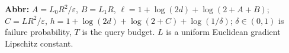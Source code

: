 \begin{table}[tp]
\begin{threeparttable}
\begin{tabularx}{\linewidth}{@{}>{\raggedright\arraybackslash}p{0.20\linewidth}>{\raggedright\arraybackslash}p{0.32\linewidth}>{\raggedright\arraybackslash}p{0.25\linewidth}>{\raggedright\arraybackslash}X@{}}
\bottomrule
\end{tabularx}
\begin{tablenotes}[flushleft]\footnotesize
\item[] \textbf{Abbr:} $A=L_0R^2/\varepsilon$, $B=L_1R$, $\ell=1+\log(2d)+\log(2+A+B)$; $C=LR^2/\varepsilon$, $h=1+\log(2d)+\log(2+C)+\log(1/\delta)$; $\delta\in(0,1)$ is failure probability, $T$ is the query budget. $L$ is a uniform Euclidean gradient Lipschitz constant.
\end{tablenotes}
\end{threeparttable}
\end{table}
\clearpage
